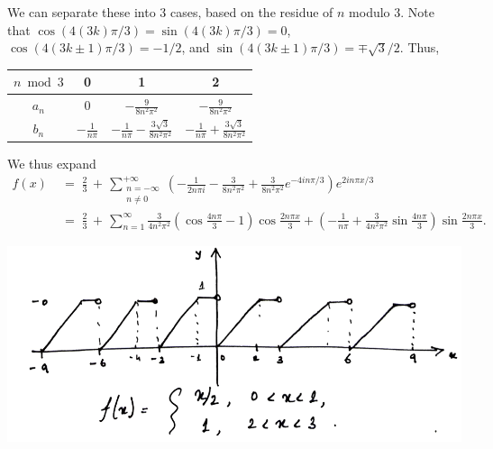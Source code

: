 \documentclass[10pt]{article}
\begin{document}
        We can separate these into 3 cases, based on the residue of $n$ modulo $3$.
        Note that $\cos(4(3k)\pi /3) = \sin(4(3k)\pi /3) = 0$, $\cos(4(3k \pm 1)\pi /3) = -1 /2$, and $\sin(4(3k \pm 1)\pi /3) = \mp \sqrt{3}/{2}$.
        Thus,
        \begin{center}
        \begin{tabular}{c||c|c|c}
                $n \bmod 3$     & 0                     & 1                             & 2 \\ \hline\hline
                $a_n$           & 0                     & $-\displaystyle\frac{9}{8n^2\pi^2}$          & $-\displaystyle\frac{9}{8n^2\pi^2}$ \\
                $b_n$           & $-\displaystyle\frac{1}{n\pi}$       & $-\displaystyle\frac{1}{n\pi} - \displaystyle\frac{3\sqrt{3}}{8n^2\pi^2}$ & 
                                                                $-\displaystyle\frac{1}{n\pi} + \displaystyle\frac{3\sqrt{3}}{8n^2\pi^2}$
        \end{tabular}
        \end{center}
        We thus expand
        \begin{align*}
                f(x) \;&=\; \frac{2}{3} \,+\, \sum_{\substack{n = -\infty \\ n \neq 0}}^{+\infty} \left(-\frac{1}{2n\pi i} - 
                                \frac{3}{8n^2\pi^2} + \frac{3}{8n^2\pi^2}e^{-4in\pi/3}\right)e^{2in\pi x/3} \\
                        \;&=\; \frac{2}{3} \,+\, \sum_{n = 1}^\infty \frac{3}{4n^2\pi^2}\left(\cos\frac{4n\pi}{3} - 1\right)\cos\frac{2n\pi x}{3} +
                                \left(-\frac{1}{n\pi} + \frac{3}{4n^2\pi^2}\sin\frac{4n\pi}{3}\right)\sin\frac{2n\pi x}{3}. \tag{$\star$}
        \end{align*}
        \begin{center}
                \includegraphics[scale=0.4]{./6_20.png}
        \end{center}
\end{document}
